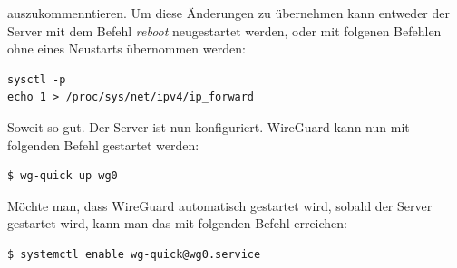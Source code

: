 auszukommenntieren. \newline\newline
Um diese Änderungen zu übernehmen kann entweder der Server mit dem Befehl \textit{reboot} neugestartet werden, oder mit folgenen Befehlen ohne eines Neustarts übernommen werden:
\begin{lstlisting}
sysctl -p
echo 1 > /proc/sys/net/ipv4/ip_forward
\end{lstlisting} \noindent
Soweit so gut. Der Server ist nun konfiguriert. \newline\newline
WireGuard kann nun mit folgenden Befehl gestartet werden:
\begin{lstlisting}
$ wg-quick up wg0
\end{lstlisting}
Möchte man, dass WireGuard automatisch gestartet wird, sobald der Server gestartet wird, kann man das mit folgenden Befehl erreichen:
\begin{lstlisting}
$ systemctl enable wg-quick@wg0.service 
\end{lstlisting}
\newpage
